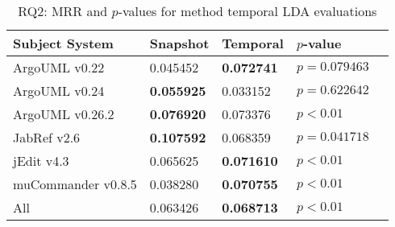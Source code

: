 
\begin{table}[t]
\renewcommand{\arraystretch}{1.3}
\footnotesize
\centering
\caption{RQ2: MRR and $p$-values for method temporal LDA evaluations}
\begin{tabular}{l|ll|ll}
   \toprule
    Subject System & Snapshot & Temporal & $p$-value  \\
    \midrule

ArgoUML v0.22 & 0.045452 & {\bf 0.072741 } & $p = 0.079463$ \\
ArgoUML v0.24 & {\bf 0.055925 } & 0.033152 & $p = 0.622642$ \\
ArgoUML v0.26.2 & {\bf 0.076920 } & 0.073376 & $p < 0.01$ \\
JabRef v2.6 & {\bf 0.107592 } & 0.068359 & $p = 0.041718$ \\
jEdit v4.3 & 0.065625 & {\bf 0.071610 } & $p < 0.01$ \\
muCommander v0.8.5 & 0.038280 & {\bf 0.070755 } & $p < 0.01$ \\
\midrule
All & 0.063426 & {\bf 0.068713 } & $p < 0.01$ \\

    \bottomrule
\end{tabular}
\label{table:rq2:method:lda}
\end{table}

